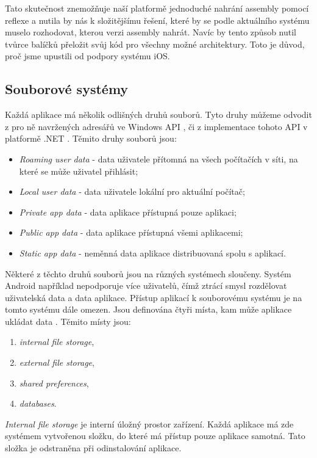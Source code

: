 Tato skutečnost znemožňuje naší platformě jednoduché nahrání assembly pomocí reflexe a nutila by nás k složitějšímu řešení, které by se podle aktuálního systému muselo rozhodovat, kterou verzi assembly nahrát. Navíc by tento způsob nutil tvůrce balíčků přeložit svůj kód pro všechny možné architektury. Toto je důvod, proč jsme upustili od podpory systému iOS.

\subsection{Souborové systémy}
\label{sec:filesystems}
Každá aplikace má několik odlišných druhů souborů. Tyto druhy můžeme odvodit z pro ně navržených adresářů ve Windows API \citep{site:knownfolders}, či z implementace tohoto API v platformě .NET \citep{site:specialfolders}. Těmito druhy souborů jsou:
\begin{itemize}
	\item \textit{Roaming user data} - data uživatele přítomná na všech počítačích v síti, na které se může uživatel přihlásit;
	\item \textit{Local user data} - data uživatele lokální pro aktuální počítač;
	\item \textit{Private app data} - data aplikace přístupná pouze aplikaci;
	\item \textit{Public app data} - data aplikace přístupná všemi aplikacemi;
	\item \textit{Static app data} - neměnná data aplikace distribuovaná spolu s aplikací.
\end{itemize} 

Některé z těchto druhů souborů jsou na různých systémech sloučeny. Systém Android například nepodporuje více uživatelů, čímž ztrácí smysl rozdělovat uživatelská data a data aplikace. Přístup aplikací k souborovému systému je na tomto systému dále omezen. Jsou definována čtyři místa, kam může aplikace ukládat data \citep{site:androiddata}. Těmito místy jsou:

\begin{enumerate}
	\item \textit{internal file storage},
	\item \textit{external file storage},
	\item \textit{shared preferences},
	\item \textit{databases}.
\end{enumerate}

\textit{Internal file storage} je interní úložný prostor zařízení. Každá aplikace má zde systémem vytvořenou složku, do které má přístup pouze aplikace samotná. Tato složka je odstraněna při odinstalování aplikace.

